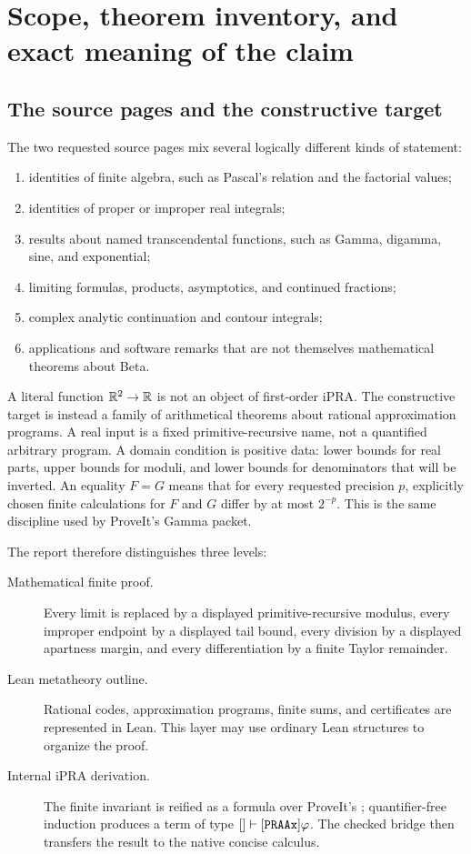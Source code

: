 \section{Scope, theorem inventory, and exact meaning of the claim}

\subsection{The source pages and the constructive target}

The two requested source pages mix several logically different kinds of statement:

\begin{enumerate}
\item identities of finite algebra, such as Pascal's relation and the factorial values;
\item identities of proper or improper real integrals;
\item results about named transcendental functions, such as Gamma, digamma, sine, and exponential;
\item limiting formulas, products, asymptotics, and continued fractions;
\item complex analytic continuation and contour integrals;
\item applications and software remarks that are not themselves mathematical theorems about Beta.
\end{enumerate}

A literal function $\mathbb R^2\to\mathbb R$ is not an object of first-order iPRA.  The constructive target is instead a family of arithmetical theorems about rational approximation programs.  A real input is a fixed primitive-recursive name, not a quantified arbitrary program.  A domain condition is positive data: lower bounds for real parts, upper bounds for moduli, and lower bounds for denominators that will be inverted.  An equality $F=G$ means that for every requested precision $p$, explicitly chosen finite calculations for $F$ and $G$ differ by at most $2^{-p}$.  This is the same discipline used by ProveIt's Gamma packet.

The report therefore distinguishes three levels:

\begin{description}
\item[Mathematical finite proof.]  Every limit is replaced by a displayed primitive-recursive modulus, every improper endpoint by a displayed tail bound, every division by a displayed apartness margin, and every differentiation by a finite Taylor remainder.
\item[Lean metatheory outline.]  Rational codes, approximation programs, finite sums, and certificates are represented in Lean.  This layer may use ordinary Lean structures to organize the proof.
\item[Internal iPRA derivation.]  The finite invariant is reified as a formula over ProveIt's ; quantifier-free induction produces a term of type $[]\vdash[\code{PRAAx}]\varphi$.  The checked bridge  then transfers the result to the native concise calculus.
\end{description}

